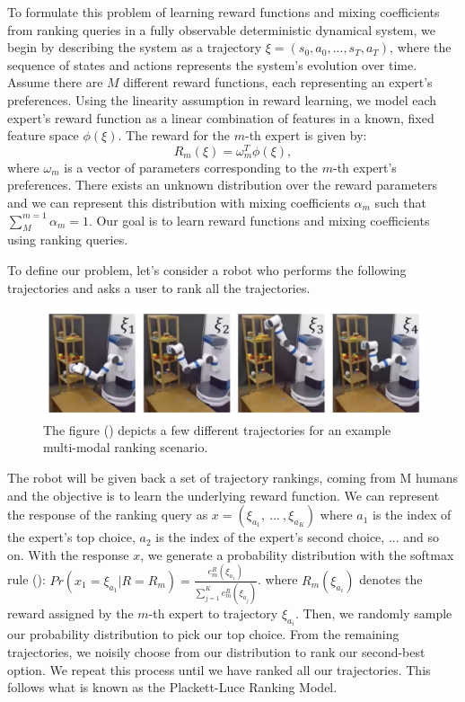 \documentclass[
  letterpaper,
  DIV=11,
  numbers=noendperiod,
  oneside]{scrreprt}
\theoremstyle{remark}
\begin{document}
To formulate this problem of learning reward functions and mixing
coefficients from ranking queries in a fully observable deterministic
dynamical system, we begin by describing the system as a trajectory
\(\xi = (s_0, a_0, ..., s_T, a_T)\), where the sequence of states and
actions represents the system's evolution over time. Assume there are
\(M\) different reward functions, each representing an expert's
preferences. Using the linearity assumption in reward learning, we model
each expert's reward function as a linear combination of features in a
known, fixed feature space \(\phi(\xi)\). The reward for the \(m\)-th
expert is given by: \[R_m(\xi) = \omega^T_m \phi(\xi),\] where
\(\omega_m\) is a vector of parameters corresponding to the \(m\)-th
expert's preferences. There exists an unknown distribution over the
reward parameters and we can represent this distribution with mixing
coefficients \(\alpha_m\) such that \(\sum_M^{m = 1} \alpha_m = 1\). Our
goal is to learn reward functions and mixing coefficients using ranking
queries.

To define our problem, let's consider a robot who performs the following
trajectories and asks a user to rank all the trajectories.

\begin{figure}

{\centering \includegraphics{src/Figures/robot-traj.png}

}

\caption{The figure () depicts a few different trajectories for an example multi-modal
ranking scenario.}

\end{figure}%

The robot will be given back a set of trajectory rankings, coming from M
humans and the objective is to learn the underlying reward function. We
can represent the response of the ranking query as
\(x = (\xi_{a_1},\ ...\ ,\xi_{a_K})\) where \(a_1\) is the index of the
expert's top choice, \(a_2\) is the index of the expert's second choice,
... and so on. With the response \(x\), we generate a probability
distribution with the softmax rule
():
\(Pr(x_1 = \xi_{a_1} | R = R_m) = \frac{e^R_m(\xi_{a_1})}{\sum_{j=1}^Ke^R_m(\xi_{a_j})}\).
where \(R_m(\xi_{a_i})\) denotes the reward assigned by the \(m\)-th
expert to trajectory \(\xi_{a_i}\). Then, we randomly sample our
probability distribution to pick our top choice. From the remaining
trajectories, we noisily choose from our distribution to rank our
second-best option. We repeat this process until we have ranked all our
trajectories. This follows what is known as the Plackett-Luce Ranking
Model.
\end{document}
